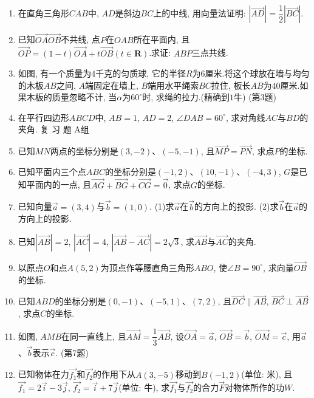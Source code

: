 \documentclass[10pt,a4paper]{article}
\begin{document}
\begin{enumerate}[1.]
(第5题)
\item 在直角三角形$CAB$中, $AD$是斜边$BC$上的中线, 用向量法证明: $|\overrightarrow{AD}|=\dfrac 12|\overrightarrow{BC}|$.
\item 已知$\overrightarrow{OA}\overrightarrow{OB}$不共线, 点$P$在$OAB$所在平面内, 且$\overrightarrow{OP}=(1-t)\overrightarrow{OA}+t\overrightarrow{OB}(t\in \mathbf{R})$.求证: $ABP$三点共线.
\item 如图, 有一个质量为$4$千克的匀质球, 它的半径$R$为$6$厘米.将这个球放在墙与均匀的木板$AB$之间, $A$端固定在墙上, $B$端用水平绳索$BC$拉住, 板长$AB$为$40$厘米.如果木板的质量忽略不计, 当$\alpha$为$60^{\circ }$时, 求绳的拉力.(精确到$1$牛)
(第3题)
\item 在平行四边形$ABCD$中, $AB=1$, $AD=2$, $\angle DAB=60^{\circ }$, 求对角线$AC$与$BD$的夹角.
复 习 题
A组
\item 已知$MN$两点的坐标分别是$(3,-2)$、$(-5,-1)$, 且$\overrightarrow{MP}=\overrightarrow{PN}$, 求点$P$的坐标.
\item 已知平面内三个点$ABC$的坐标分别是$(-1,2)$、$(10,-1)$、$(-4,3)$, $G$是已知平面内的一点, 且$\overrightarrow{AG}+\overrightarrow{BG}+\overrightarrow{CG}=\overrightarrow 0$, 求点$G$的坐标.
\item 已知向量$\overrightarrow a=(3,4)$与$\overrightarrow b=(1,0)$.
(1)求$\overrightarrow a$在$\overrightarrow b$的方向上的投影.
(2)求$\overrightarrow b$在$\overrightarrow a$的方向上的投影.
\item 已知$|\overrightarrow{AB}|=2$, $|\overrightarrow{AC}|=4$, $|\overrightarrow{AB}-\overrightarrow{AC}|=2\sqrt 3$, 求$\overrightarrow{AB}$与$\overrightarrow{AC}$的夹角.
\item 以原点$O$和点$A(5,2)$为顶点作等腰直角三角形$ABO$, 使$\angle B=90^{\circ }$, 求向量$\overrightarrow{OB}$的坐标.
\item 已知$ABD$的坐标分别是$(0,-1)$、$(-5,1)$、$(7,2)$, 且$\overrightarrow{DC}\parallel \overrightarrow{AB}$, $\overrightarrow{BC}\perp \overrightarrow{AB}$, 求点$C$的坐标.
\item 如图, $AMB$在同一直线上, 且$\overrightarrow{AM}=\dfrac 13\overrightarrow{AB}$, 设$\overrightarrow{OA}=\overrightarrow a$, $\overrightarrow{OB}=\overrightarrow b$, $\overrightarrow{OM}=\overrightarrow c$, 用$\overrightarrow a$、$\overrightarrow b$表示$\overrightarrow c$.
(第7题)
\item 已知物体在力$\overrightarrow{f_1}$和$\overrightarrow{f_2}$的作用下从$A(3,-5)$移动到$B(-1,2)$(单位: 米), 且$\overrightarrow{f_1}=2\overrightarrow i-3\overrightarrow j$, $\overrightarrow{f_2}=\overrightarrow i+7\overrightarrow j$(单位: 牛), 求$\overrightarrow{f_1}$与$\overrightarrow{f_2}$的合力$\overrightarrow F$对物体所作的功$W$.

\end{enumerate}
\end{document}
